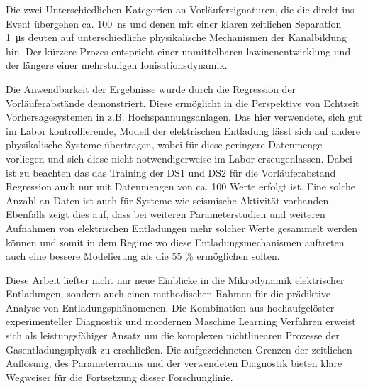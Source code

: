 Die zwei Unterschiedlichen Kategorien an Vorläufersignaturen, die die direkt ins Event übergehen ca. \SI{100}{\nano\second} und denen mit einer klaren zeitlichen Separation \SI{1}{\micro\second} deuten auf unterschiedliche physikalische Mechanismen der Kanalbildung hin. Der kürzere Prozes entspricht einer unmittelbaren lawinenentwicklung und der längere einer mehrstufigen Ionisationsdynamik. 

Die Anwendbarkeit der Ergebnisse wurde durch die Regression der Vorläuferabstände demonstriert. Diese ermöglicht in die Perspektive von Echtzeit Vorhersagesystemen in z.B. Hochspannungsanlagen. Das hier verwendete, sich gut im Labor kontrollierende, Modell der elektrischen Entladung lässt sich auf andere physikalische Systeme übertragen, wobei für diese geringere Datenmenge vorliegen und sich diese nicht notwendigerweise im Labor erzeugenlassen. Dabei ist zu beachten das das Training der DS1 und DS2 für die Vorläuferabstand Regression auch nur mit Datenmengen von ca. 100 Werte erfolgt ist. Eine solche Anzahl an Daten ist auch für Systeme wie seismische Aktivität vorhanden. Ebenfalls zeigt dies auf, dass bei weiteren Parameterstudien und weiteren Aufnahmen von elektrischen Entladungen mehr solcher Werte gesammelt werden können und somit in dem Regime wo diese Entladungsmechanismen auftreten auch eine bessere Modelierung als die 55 \% ermöglichen solten. 

Diese Arbeit liefter nicht nur neue Einblicke in die Mikrodynamik elektrischer Entladungen, sondern auch einen methodischen Rahmen für die prädiktive Analyse von Entladungsphänomenen. Die Kombination aus hochaufgelöster experimenteller Diagnostik und mordernen Maschine Learning Verfahren erweist sich als leistungsfähiger Ansatz um die komplexen nichtlinearen Prozesse der Gasentladungsphysik zu erschließen. Die aufgezeichneten Grenzen der zeitlichen Auflösung, des Parameterraums und der verwendeten Diagnostik bieten klare Wegweiser für die Fortsetzung dieser Forschunglinie.

